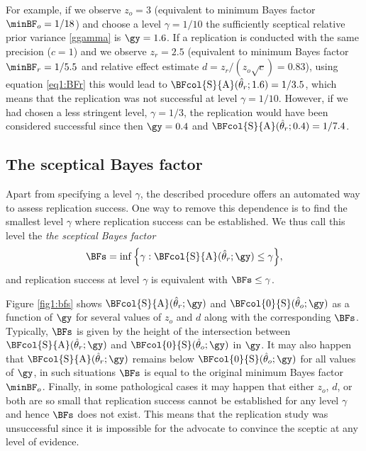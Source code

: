 For example, if we observe $z_o = 3$ (equivalent to minimum Bayes factor
$\minBF_{o} = 1/18$) and choose a level $\gamma = 1/10$
the sufficiently sceptical relative prior variance \eqref{ggamma} is
$\gy = 1.6$. If a replication is conducted with the
same precision ($c = 1$) and we observe $z_r = 2.5$ (equivalent to
minimum Bayes factor $\minBF_{r} = 1/5.5$ and relative effect
estimate $d = z_{r}/(z_{o}\sqrt{c}) = 0.83$), using equation
\eqref{eq1:BFr} this would lead to $\BFcol{\mathrm{S}}{\mathrm{A}}(\hat{\theta}_r;
1.6) = 1/3.5$, which means
that the replication was not successful at level $\gamma = 1/10$.
However, if we had chosen a less stringent level, \eg$\gamma =
1/3$, the replication would have been considered successful
since then $\gy = 0.4$ and
$\BFcol{\mathrm{S}}{\mathrm{A}}(\hat{\theta}_r; 0.4)
= 1/7.4$.

\subsection{The sceptical Bayes factor}
Apart from specifying a level $\gamma$, the described procedure offers an
automated way to assess replication success. One way to remove this dependence
is to find the smallest level $\gamma$ where replication success can be
established. We thus call this level the \emph{the sceptical Bayes factor}
\begin{align}
  \label{eq1:bfs}
  \BFs
  =
  \inf
  \Big\{\gamma :
  \BFcol{\mathrm{S}}{\mathrm{A}}(\hat{\theta}_r; \gy)
  \leq \gamma\Big\},
\end{align}
and replication success at level $\gamma$ is equivalent with $\BFs \leq \gamma$.

Figure \ref{fig1:bfs} shows $\BFcol{\mathrm{S}}{\mathrm{A}}(\hat{\theta}_r; \gy)$ and
$\BFcol{0}{\mathrm{S}}(\hat{\theta}_o; \gy)$ as a function of $\gy$ for several
values of $z_o$ and $d$ along with the corresponding $\BFs$. Typically, $\BFs$
is given by the height of the intersection between
$\BFcol{\mathrm{S}}{\mathrm{A}}(\hat{\theta}_r; \gy)$ and
$\BFcol{0}{\mathrm{S}}(\hat{\theta}_o; \gy)$ in $\gy$. It may also happen that
$\BFcol{\mathrm{S}}{\mathrm{A}}(\hat{\theta}_r; \gy)$ remains below
$\BFcol{0}{\mathrm{S}}(\hat{\theta}_o; \gy)$ for all values of $\gy$, in such
situations $\BFs$ is equal to the original minimum Bayes factor $\minBF_o$.
Finally, in some pathological cases it may happen that either $z_o$, $d$, or
both are so small that replication success cannot be established for any level
$\gamma$ and hence $\BFs$ does not exist. This means that the replication study
was unsuccessful since it is impossible for the advocate to convince the sceptic
at any level of evidence.


